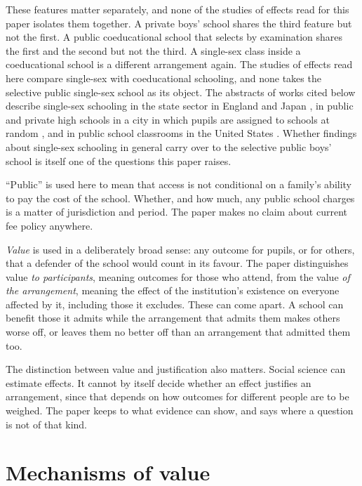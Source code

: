 \documentclass[11pt]{article}
\newcounter{mech}
\begin{document}
These features matter separately, and none of the studies of effects read for this paper isolates them together. A private boys' school shares the third feature but not the first. A public coeducational school that selects by examination shares the first and the second but not the third. A single-sex class inside a coeducational school is a different arrangement again. The studies of effects read here compare single-sex with coeducational schooling, and none takes the selective public single-sex school as its object. The abstracts of works cited below describe single-sex schooling in the state sector in England and Japan \citep{aspinall2024history}, in public and private high schools in a city in which pupils are assigned to schools at random \citep{park2012}, and in public school classrooms in the United States \citep{williams2016}. Whether findings about single-sex schooling in general carry over to the selective public boys' school is itself one of the questions this paper raises.

``Public'' is used here to mean that access is not conditional on a family's ability to pay the cost of the school. Whether, and how much, any public school charges is a matter of jurisdiction and period. The paper makes no claim about current fee policy anywhere.

\emph{Value} is used in a deliberately broad sense: any outcome for pupils, or for others, that a defender of the school would count in its favour. The paper distinguishes value \emph{to participants}, meaning outcomes for those who attend, from the value \emph{of the arrangement}, meaning the effect of the institution's existence on everyone affected by it, including those it excludes. These can come apart. A school can benefit those it admits while the arrangement that admits them makes others worse off, or leaves them no better off than an arrangement that admitted them too.

The distinction between value and justification also matters. Social science can estimate effects. It cannot by itself decide whether an effect justifies an arrangement, since that depends on how outcomes for different people are to be weighed. The paper keeps to what evidence can show, and says where a question is not of that kind.

\section{Mechanisms of value}\label{sec:mechanisms}
\end{document}
